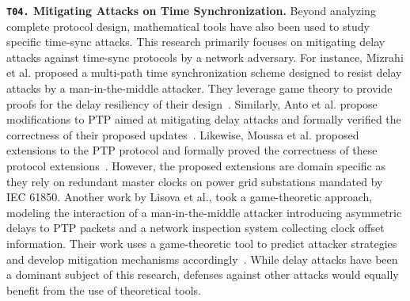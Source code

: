 \noindent\textbf{\texttt{T04.} Mitigating Attacks on Time Synchronization.} Beyond analyzing complete protocol design, mathematical tools have also been used to study specific time-sync attacks. This research primarily focuses on mitigating delay attacks against time-sync protocols by a network adversary. For instance, Mizrahi et al. proposed a multi-path time synchronization scheme designed to resist delay attacks by a man-in-the-middle attacker. They leverage game theory to provide proofs for the delay resiliency of their design~\cite{multi-path-game-theory}. Similarly, Anto et al. propose modifications to PTP aimed at mitigating delay attacks and formally verified the correctness of their proposed updates~\cite{theory-formal-attack-1588}. Likewise, Moussa et al. proposed extensions to the PTP protocol and formally proved the correctness of these protocol extensions~\cite{theory-smart-grids, theory-ptp-extension}. However, the proposed extensions are domain specific as they rely on redundant master clocks on power grid substations mandated by IEC 61850. Another work by Lisova et al., took a game-theoretic approach, modeling the interaction of a man-in-the-middle attacker introducing asymmetric delays to PTP packets and a network inspection system collecting clock offset information. Their work uses a game-theoretic tool to predict attacker strategies and develop mitigation mechanisms accordingly~\cite{theory-game-theory-1588}. While delay attacks have been a dominant subject of this research, defenses against other attacks would equally benefit from the use of theoretical tools.